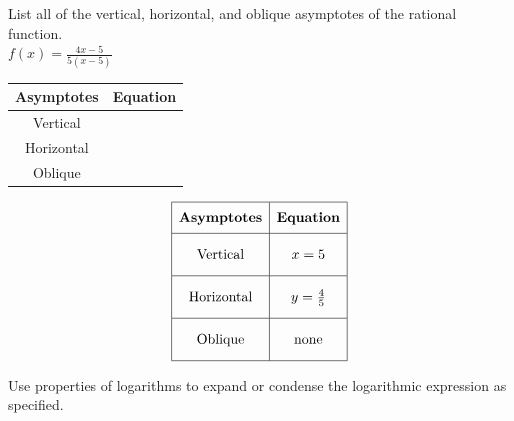 \documentclass[addpoints]{exam}
\begin{document}
\begin{questions}
\question[3]
List all of the vertical, horizontal, and oblique asymptotes of the rational function.\\

\(\displaystyle{ f(x) = \displaystyle{\frac{4x - 5}{5(x - 5)}} }\)

\renewcommand{\arraystretch}{3}
	\begin{tabular}{|c|c|}
		\hline
		\textbf{Asymptotes}  & \textbf{Equation} \\ \hline
		Vertical   & \hspace{50mm}         \\ \hline
		Horizontal &          \\ \hline
		Oblique    &          \\ \hline
	\end{tabular}
\begin{solution}
\[\begin{array}{|c|c|} \hline \rule[-0.8em]{0pt}{2.2em} \textbf{Asymptotes} & \textbf{Equation} \\ \hline \rule[-1.2em]{0pt}{3em} \text{Vertical} & x = 5 \\ \hline \rule[-1.2em]{0pt}{3em} \text{Horizontal} & y = \frac{4}{5} \\ \hline \rule[-1.2em]{0pt}{3em} \text{Oblique} & \text{none} \\ \hline \end{array}\]
\end{solution}
\newpage

\question Use properties of logarithms to expand or condense the logarithmic expression as specified.
\end{questions}
\end{document}
